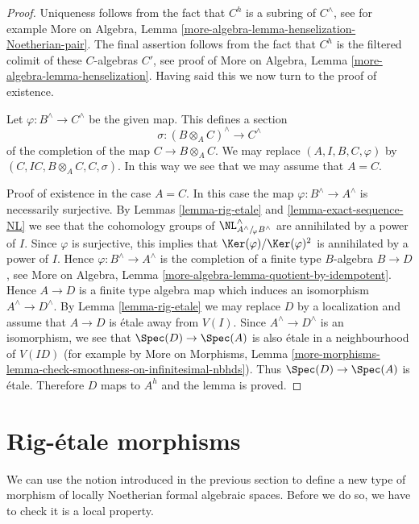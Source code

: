 \begin{proof}
Uniqueness follows from the fact that $C^h$ is a subring of
$C^\wedge$, see for example
More on Algebra, Lemma \ref{more-algebra-lemma-henselization-Noetherian-pair}.
The final assertion follows from the fact that $C^h$ is the filtered colimit
of these $C$-algebras $C'$, see proof of
More on Algebra, Lemma \ref{more-algebra-lemma-henselization}.
Having said this we now turn to the proof of existence.

\medskip\noindent
Let $\varphi : B^\wedge \to C^\wedge$ be the given map.
This defines a section
$$
\sigma : (B \otimes_A C)^\wedge \longrightarrow C^\wedge
$$
of the completion of the map $C \to B \otimes_A C$. We may
replace $(A, I, B, C, \varphi)$ by $(C, IC, B \otimes_A C, C, \sigma)$.
In this way we see that we may assume that $A = C$.

\medskip\noindent
Proof of existence in the case $A = C$. In this case the map
$\varphi : B^\wedge \to A^\wedge$ is necessarily surjective.
By Lemmas \ref{lemma-rig-etale} and \ref{lemma-exact-sequence-NL}
we see that the cohomology groups of
$\NL^\wedge_{A^\wedge/\!_\varphi B^\wedge}$
are annihilated by a power of $I$. Since $\varphi$ is surjective,
this implies that $\Ker(\varphi)/\Ker(\varphi)^2$ is annihilated
by a power of $I$. Hence $\varphi : B^\wedge \to A^\wedge$
is the completion of a finite type $B$-algebra $B \to D$, see
More on Algebra, Lemma \ref{more-algebra-lemma-quotient-by-idempotent}.
Hence $A \to D$ is a finite type algebra map which induces an isomorphism
$A^\wedge \to D^\wedge$. By
Lemma \ref{lemma-rig-etale} we may replace $D$ by a localization
and assume that $A \to D$ is \'etale away from $V(I)$.
Since $A^\wedge \to D^\wedge$ is an isomorphism, we see that
$\Spec(D) \to \Spec(A)$ is also \'etale in a neighbourhood of $V(ID)$
(for example by
More on Morphisms, Lemma
\ref{more-morphisms-lemma-check-smoothness-on-infinitesimal-nbhds}).
Thus $\Spec(D) \to \Spec(A)$ is \'etale. Therefore $D$ maps to
$A^h$ and the lemma is proved.
\end{proof}






\section{Rig-\'etale morphisms}
\label{section-rig-etale-morphisms}

\noindent
We can use the notion introduced in the previous section to define
a new type of morphism of locally Noetherian formal algebraic spaces.
Before we do so, we have to check it is a local property.

